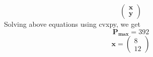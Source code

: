 \documentclass[journal,12pt,twocolumn]{IEEEtran}
\let\vec\mathbf
\begin{document}
\begin{tableofcontents}
\begin{equation}
	\begin{pmatrix}
		\vec{x}\\
		\vec{y}
	\end{pmatrix}	
\end{equation}
Solving above equations using cvxpy, we get\\
\begin{equation}
	\vec{P_{max}}=392
\end{equation}
\begin{equation}
	\vec{x}=
\begin{pmatrix}
8\\
12\end{pmatrix}
\end{equation}
\end{tableofcontents}
\end{document}
